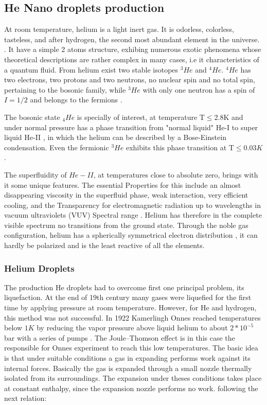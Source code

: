 \subsection{He Nano droplets production}

At room temperature, helium is a light inert gas. It is odorless, colorless, tasteless, and after hydrogen, the second most abundant element in the universe.  \cite{enss_low-temperature_2005}. It have a simple 2 atoms structure, exhibing numerous exotic phenomena whose theoretical descriptions are rather complex in many cases, i.e it characteristics of  a quantum fluid. From helium exist  two stable isotopes $^{3}He$ and $^{4}He$.  $^{4}He$ has two electrons, two protons and two neutrons, no nuclear spin and no total spin, pertaining to the bosonic family, while $^{3}He$ with only one neutron has a spin of $I = 1/2$ and belongs to the fermions \cite{atkins_liquid_2014}.

The bosonic state $_{4}He$ is specially of interest, at  temperature T$\leqslant$2.8K and under normal pressure has a phase transition from "normal liquid" He-I to super liquid He-II \cite{swenson_liquid-solid_1950}, in which the helium can be described by a Bose-Einstein condensation. Even the fermionic $^{3}He$ exhibits this phase transition at T$\leqslant 0.03K$ \cite{halperin_properties_1978}.

The superfluidity of $He-II$, at temperatures close to absolute zero, brings with it some unique features. The essential Properties for this include an almost disappearing viscosity in the superfluid phase, weak interaction, very efficient cooling, and the Transparency for electromagnetic radiation up to wavelengths in vacuum ultraviolets (VUV) Spectral range \cite{enss_low-temperature_2005}. Helium has therefore in the complete visible spectrum no transitions from the ground state. Through the noble gas configuration, helium has a spherically symmetrical electron distribution \cite{lewis_helium_2014}, it can hardly be polarized and is the least reactive of all the elements.

\subsubsection{Helium Droplets}

The production He droplets had to overcome first one principal problem, its liquefaction. At the end  of 19th century many gases were liquefied for the first time by applying pressure at room temperature. However, for He and hydrogen, this method was not successful. In 1922 Kamerlingh Onnes reached temperatures below $1K$ by reducing the vapor pressure above liquid helium to about $2*10^{-5}$ bar with a series of pumps \cite{van_delft_discovery_2010}. The Joule–Thomson effect \cite{weinberger_discovery_2013} is in this case the responsible for Onnes experiment to reach this low temperatures. The basic idea is that under suitable conditions a gas in expanding performs work against its internal forces. Basically the gas is expanded through a small nozzle thermally isolated from its surroundings. The expansion under theses conditions takes place at constant enthalpy, since the expansion nozzle performs no work. following the next relation:

